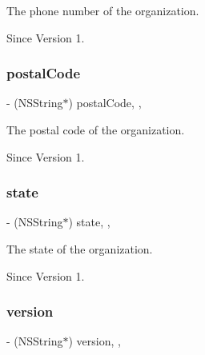 The phone number of the organization. 

\begin{DoxySince}{Since}
Version 1. 
\end{DoxySince}
\hypertarget{class_x_i_organization_info_a6383de899ad410f0124af3d0967a7e9e}{}\label{class_x_i_organization_info_a6383de899ad410f0124af3d0967a7e9e} 
\subsubsection{\texorpdfstring{postal\+Code}{postalCode}}
{\footnotesize\ttfamily -\/ (N\+S\+String$\ast$) postal\+Code\hspace{0.3cm}{\ttfamily [read]}, {\ttfamily [nonatomic]}, {\ttfamily [assign]}}



The postal code of the organization. 

\begin{DoxySince}{Since}
Version 1. 
\end{DoxySince}
\hypertarget{class_x_i_organization_info_a8e312871866c60905af3c614e72a221b}{}\label{class_x_i_organization_info_a8e312871866c60905af3c614e72a221b} 
\subsubsection{\texorpdfstring{state}{state}}
{\footnotesize\ttfamily -\/ (N\+S\+String$\ast$) state\hspace{0.3cm}{\ttfamily [read]}, {\ttfamily [nonatomic]}, {\ttfamily [assign]}}



The state of the organization. 

\begin{DoxySince}{Since}
Version 1. 
\end{DoxySince}
\hypertarget{class_x_i_organization_info_a0e447ed591b36d1b7ef026ae6c0ce7af}{}\label{class_x_i_organization_info_a0e447ed591b36d1b7ef026ae6c0ce7af} 
\subsubsection{\texorpdfstring{version}{version}}
{\footnotesize\ttfamily -\/ (N\+S\+String$\ast$) version\hspace{0.3cm}{\ttfamily [read]}, {\ttfamily [nonatomic]}, {\ttfamily [assign]}}



